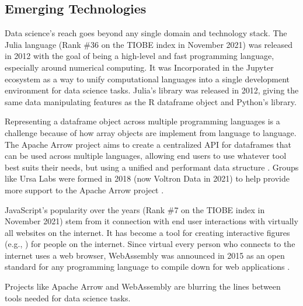 \documentclass[010-intro.tex]{subfiles}
\begin{document}
\subsection{Emerging Technologies}

    Data science's reach goes beyond any single domain and technology stack.
    The Julia language (Rank \#36 on the TIOBE index in November 2021)
    was released in 2012 with the goal of being a high-level and fast programming language,
    especially around numerical computing.
    It was Incorporated in the Jupyter ecosystem as a way to unify computational languages into a single
    development environment for data science tasks.
    Julia's  library was released in 2012, giving the same data manipulating
    features as the R dataframe object and Python's  library.
    
    Representing a dataframe object across multiple programming languages is a challenge because of
    how array objects are implement from language to language.
    The Apache Arrow project aims to create a centralized API for dataframes that can be used across multiple languages,
    allowing end users to use whatever tool best suits their needs,
    but using a unified and performant data structure
    \cite{ApacheArrow}.
    Groups like Ursa Labs were formed in 2018 (now Voltron Data in 2021) to help provide
    more support to the Apache Arrow project
    \cite{UrsaLabs, VoltronData}.
    
    JavaScript's popularity over the years (Rank \#7 on the TIOBE index in November 2021)
    stem from it connection with end user interactions with
    virtually all websites on the internet.
    It has become a tool for creating interactive figures (e.g., ) for people on the internet.
    Since virtual every person who connects to the internet uses a web browser,
    WebAssembly was announced in 2015 as an open standard for any programming language
    to compile down for web applications
    \cite{WebAssembly}.
    
    Projects like Apache Arrow and WebAssembly are blurring the lines between tools needed for data science tasks.
\end{document}
